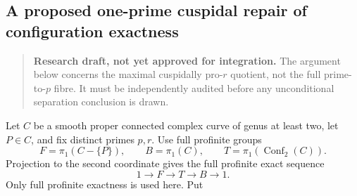 \subsection{A proposed one-prime cuspidal repair of configuration exactness}

\begin{quote}
\textbf{Research draft, not yet approved for integration.}
The argument below concerns the maximal cuspidally pro-\(r\) quotient,
not the full prime-to-\(p\) fibre. It must be independently audited before
any unconditional separation conclusion is drawn.
\end{quote}

Let \(C\) be a smooth proper connected complex curve of genus at least two,
let \(P\in C\), and fix distinct primes \(p,r\). Use full profinite groups
\[
 F=\pi_1(C-\{P\}),\qquad B=\pi_1(C),\qquad
 T=\pi_1(\operatorname{Conf}_2(C)).
\]
Projection to the second coordinate gives the full profinite exact sequence
\[
                   1\longrightarrow F\longrightarrow T
                     \longrightarrow B\longrightarrow1.       \tag{CR.1}
\]
Only full profinite exactness is used here. Put
